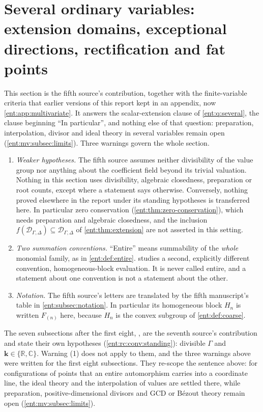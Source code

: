 \documentclass[11pt]{article}
\theoremstyle{plain}
\theoremstyle{plain}
\theoremstyle{plain}
\theoremstyle{definition}
\theoremstyle{definition}
\theoremstyle{definition}
\theoremstyle{definition}
\theoremstyle{remark}
\newcommand{\C}{\mathbb C}\newcommand{\R}{\mathbb R}
\newcommand{\Dom}{\mathcal D_{\Gamma,\Delta}}
\newcommand{\kk}{\mathbf k}\newcommand{\PP}{\mathbb P}
\begin{document}
\section{Several ordinary variables: extension domains, exceptional
directions, rectification and fat points}
\label{ent:sec:multivariable}

This section is the fifth source's contribution, together with the
finite-variable criteria that earlier versions of this report kept in an
appendix, now \cref{ent:app:multivariate}. It answers the scalar-extension
clause of \cref{ent:q:several}, the clause beginning ``In particular'', and
nothing else of that question: preparation, interpolation, divisor and ideal
theory in several variables remain open (\cref{ent:mv:subsec:limits}).
Three warnings govern the whole section.

\begin{enumerate}[label=(\arabic*),leftmargin=2em]
\item \emph{Weaker hypotheses.} The fifth source assumes neither
divisibility of the value group nor anything about the coefficient field
beyond its trivial valuation. Nothing in this section uses divisibility,
algebraic closedness, preparation or root counts, except where a statement
says otherwise. Conversely, nothing proved elsewhere in the report under its
standing hypotheses is transferred here. In particular zero conservation
(\cref{ent:thm:zero-conservation}), which needs preparation and algebraic
closedness, and the inclusion $f(\Dom)\subseteq\Dom$ of
\cref{ent:thm:extension} are not asserted in this setting.
\item \emph{Two summation conventions.} ``Entire'' means summability of the
\emph{whole} monomial family, as in \cref{ent:def:entire}.
 studies a second, explicitly different
convention, homogeneous-block evaluation. It is never called entire, and a
statement about one convention is not a statement about the other.
\item \emph{Notation.} The fifth source's letters are translated by the
fifth manuscript's table in \cref{ent:subsec:notation}. In particular its homogeneous block
$H_n$ is written $F_{(n)}$ here, because $H_n$ is the convex subgroup of
\cref{ent:def:coarse}.
\end{enumerate}

The seven subsections after the first eight,
, are the seventh
source's contribution and state their own hypotheses
(\cref{ent:rc:conv:standing}): divisible $\Gamma$ and $\kk\in\{\R,\C\}$.
Warning (1) does not apply to them, and the three warnings above were written
for the first eight subsections. They re-scope the sentence above: for
configurations of points that an entire automorphism carries into a
coordinate line, the ideal theory and the interpolation of values are settled
there, while preparation, positive-dimensional divisors and GCD or B\'ezout
theory remain open (\cref{ent:mv:subsec:limits}).
\end{document}
